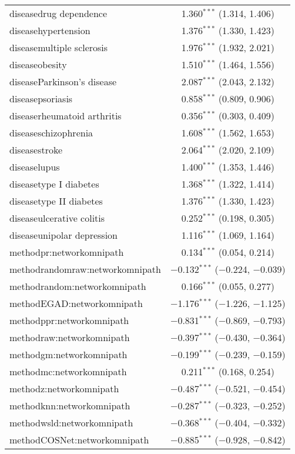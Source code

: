 \begin{table}[!htbp]
\begin{tabular}{@{\extracolsep{5pt}}lc}
  diseasedrug dependence & 1.360$^{***}$ (1.314, 1.406) \\ 
  diseasehypertension & 1.376$^{***}$ (1.330, 1.423) \\ 
  diseasemultiple sclerosis & 1.976$^{***}$ (1.932, 2.021) \\ 
  diseaseobesity & 1.510$^{***}$ (1.464, 1.556) \\ 
  diseaseParkinson's disease & 2.087$^{***}$ (2.043, 2.132) \\ 
  diseasepsoriasis & 0.858$^{***}$ (0.809, 0.906) \\ 
  diseaserheumatoid arthritis & 0.356$^{***}$ (0.303, 0.409) \\ 
  diseaseschizophrenia & 1.608$^{***}$ (1.562, 1.653) \\ 
  diseasestroke & 2.064$^{***}$ (2.020, 2.109) \\ 
  diseaselupus & 1.400$^{***}$ (1.353, 1.446) \\ 
  diseasetype I diabetes & 1.368$^{***}$ (1.322, 1.414) \\ 
  diseasetype II diabetes & 1.376$^{***}$ (1.330, 1.423) \\ 
  diseaseulcerative colitis & 0.252$^{***}$ (0.198, 0.305) \\ 
  diseaseunipolar depression & 1.116$^{***}$ (1.069, 1.164) \\ 
  methodpr:networkomnipath & 0.134$^{***}$ (0.054, 0.214) \\ 
  methodrandomraw:networkomnipath & $-$0.132$^{***}$ ($-$0.224, $-$0.039) \\ 
  methodrandom:networkomnipath & 0.166$^{***}$ (0.055, 0.277) \\ 
  methodEGAD:networkomnipath & $-$1.176$^{***}$ ($-$1.226, $-$1.125) \\ 
  methodppr:networkomnipath & $-$0.831$^{***}$ ($-$0.869, $-$0.793) \\ 
  methodraw:networkomnipath & $-$0.397$^{***}$ ($-$0.430, $-$0.364) \\ 
  methodgm:networkomnipath & $-$0.199$^{***}$ ($-$0.239, $-$0.159) \\ 
  methodmc:networkomnipath & 0.211$^{***}$ (0.168, 0.254) \\ 
  methodz:networkomnipath & $-$0.487$^{***}$ ($-$0.521, $-$0.454) \\ 
  methodknn:networkomnipath & $-$0.287$^{***}$ ($-$0.323, $-$0.252) \\ 
  methodwsld:networkomnipath & $-$0.368$^{***}$ ($-$0.404, $-$0.332) \\ 
  methodCOSNet:networkomnipath & $-$0.885$^{***}$ ($-$0.928, $-$0.842) \\ 

\end{tabular}
\end{table}
